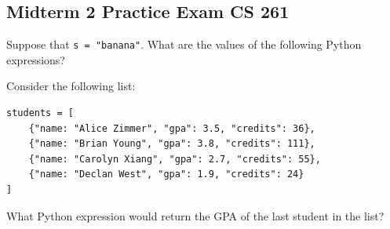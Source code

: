 \documentclass[12pt]{exam}
\begin{document}
\pagestyle{empty}
\graphicspath{{/home/brian/Dropbox/HSC/Spring16/Math111/}}

\subsection*{Midterm 2 Practice Exam   \hfill CS 261}

\begin{questions}

\question[12] Suppose that \verb|s = "banana"|. What are the values of the following Python expressions?

\question[8] Consider the following list:
\begin{verbatim}
students = [
    {"name: "Alice Zimmer", "gpa": 3.5, "credits": 36}, 
    {"name: "Brian Young", "gpa": 3.8, "credits": 111}, 
    {"name: "Carolyn Xiang", "gpa": 2.7, "credits": 55},
    {"name: "Declan West", "gpa": 1.9, "credits": 24}
]
\end{verbatim}

\begin{parts}
\item What Python expression would return the GPA of the last student in the list?  
\vfill


\end{parts}
\end{questions}
\end{document}
